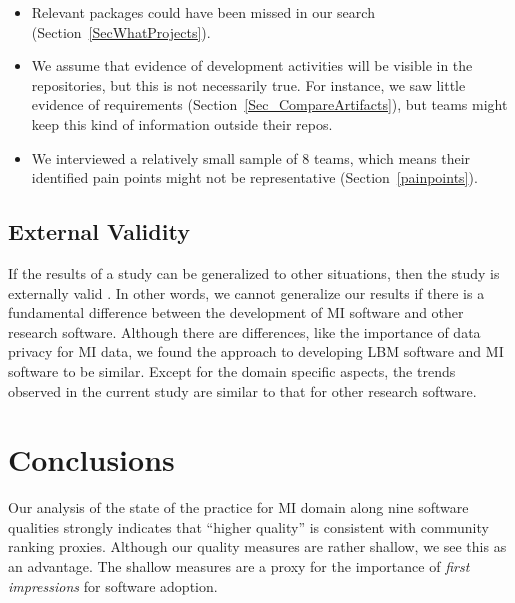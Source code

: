 \documentclass[draft, 12pt, 3p, times]{elsarticle} %
\begin{document}
\begin{itemize}
\item Relevant packages could have been missed in our search
(Section~\ref{SecWhatProjects}).
\item We assume that evidence of development activities
will be visible in the repositories, but this is not necessarily true. For
instance, we saw little evidence of requirements
(Section~\ref{Sec_CompareArtifacts}), but teams might keep this kind of
information outside their repos.
\item We interviewed a relatively small sample of 8 teams, which means their
identified pain points might not be representative (Section~\ref{painpoints}).
\end{itemize}

\subsection{External Validity}

If the results of a study can be generalized to other situations, then the study
is externally valid \cite{RunesonAndHost2009}.  In other words, we cannot
generalize our results if there is a fundamental difference between the
development of MI software and other research software.  Although there are
differences, like the importance of data privacy for MI data, we found the
approach to developing LBM software \cite{SmithEtAl2024} and MI software to be
similar.  Except for the domain specific aspects, the trends observed in the
current study are similar to that for other research software.

\section{Conclusions} \label{ch_conclusions}

Our analysis of the state of the practice for MI domain along nine software
qualities strongly indicates that ``higher quality'' is consistent with
community ranking proxies. Although our quality measures are rather shallow, we
see this as an advantage. The shallow measures are a proxy for the importance of
\emph{first impressions} for software adoption.
\end{document}
